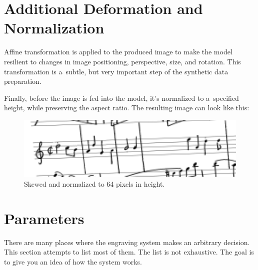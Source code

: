 \section{Additional Deformation and Normalization}

Affine transformation is applied to the produced image to make the model resilient to changes in image positioning, perspective, size, and rotation. This transformation is a~subtle, but very important step of the synthetic data preparation.

Finally, before the image is fed into the model, it's normalized to a~specified height, while preserving the aspect ratio. The resulting image can look like this:

\begin{figure}[h]
    \centering
    \includegraphics[width=120mm]{../img/normalized-image}
    \caption{Skewed and normalized to 64 pixels in height.}
    \label{fig5:NormalizedImage}
\end{figure}


\section{Parameters}

There are many places where the engraving system makes an arbitrary decision. This section attempts to list most of them. The list is not exhaustive. The goal is to give you an idea of how the system works.

